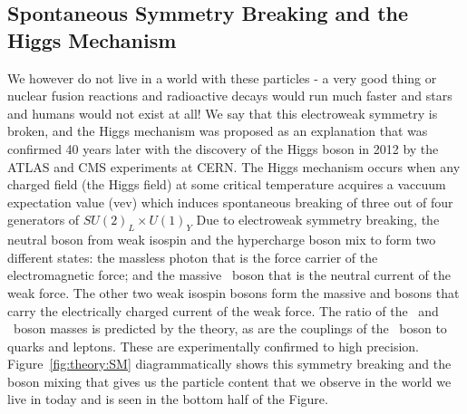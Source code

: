 \subsection{Spontaneous Symmetry Breaking and the Higgs Mechanism}
We however do not live in a world with these particles - a very good thing or nuclear fusion reactions and radioactive decays would run much faster and stars and humans would not exist at all!
We say that this electroweak symmetry is broken, and the Higgs mechanism was proposed as an explanation that was confirmed 40 years later with the discovery of the Higgs boson in 2012 by the ATLAS and CMS experiments at CERN.
The Higgs mechanism occurs when any charged field (the Higgs field) at some critical temperature acquires a vaccuum expectation value (vev) which induces spontaneous breaking of three out of four generators of $SU(2)_{L}\times U(1)_{Y}$ 
Due to electroweak symmetry breaking, the neutral boson from weak isospin and the hypercharge boson mix to form two different states: the massless photon that is the force carrier of the electromagnetic force; and the massive \Zboson\ boson that is the neutral current of the weak force.
The other two weak isospin bosons form the massive \Wplus and \Wminus bosons that carry the electrically charged current of the weak force.
The ratio of the \Wboson\ and \Zboson\ boson masses is predicted by the theory, as are the couplings of the \Zboson\ boson to quarks and leptons.
These are experimentally confirmed to high precision.
Figure~\ref{fig:theory:SM} diagrammatically shows this symmetry breaking and the boson mixing that gives us the particle content that we observe in the world we live in today and is seen in the bottom half of the Figure. 

